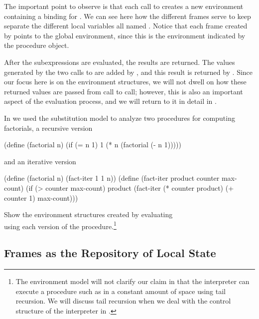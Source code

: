 The important point to observe is that each call to  creates a new
environment containing a binding for .  We can see here how the
different frames serve to keep separate the different local variables all named
.  Notice that each frame created by  points to the global
environment, since this is the environment indicated by the 
procedure object.

After the subexpressions are evaluated, the results are returned.  The values
generated by the two calls to  are added by ,
and this result is returned by .  Since our focus here is on the
environment structures, we will not dwell on how these returned values are
passed from call to call; however, this is also an important aspect of the
evaluation process, and we will return to it in detail in .

\begin{exerciseGroup}
\label{Exercise 3.9}
 In  we used the
substitution model to analyze two procedures for computing factorials, a
recursive version

\begin{codeBlock}
(define (factorial n)
  (if (= n 1) 1 (* n (factorial (- n 1)))))
\end{codeBlock}

\noindent
and an iterative version

\begin{codeBlock}
(define (factorial n) (fact-iter 1 1 n))
(define (fact-iter product counter max-count)
  (if (> counter max-count)
      product
      (fact-iter (* counter product)
                 (+ counter 1)
                 max-count)))
\end{codeBlock}

Show the environment structures created by evaluating \\ 
using each version of the  procedure.\footnote{The environment
model will not clarify our claim in  that the interpreter
can execute a procedure such as  in a constant amount of space
using tail recursion.  We will discuss tail recursion when we deal with the
control structure of the interpreter in .}
\end{exerciseGroup}

\subsection{Frames as the Repository of Local State}
\label{Section 3.2.3}

